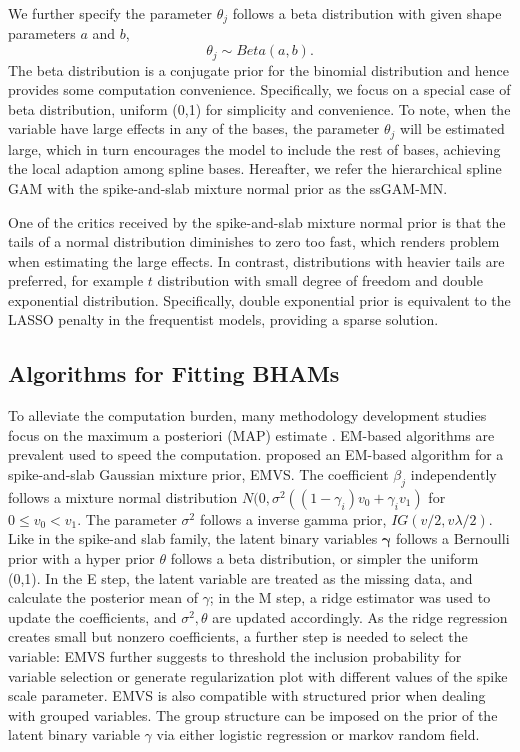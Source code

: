 \documentclass[AMA,STIX1COL,]{WileyNJD-v2}
\begin{document}
We further specify the parameter \(\theta_j\) follows a beta
distribution with given shape parameters \(a\) and \(b\), \[
\theta_j \sim Beta(a, b).
\] The beta distribution is a conjugate prior for the binomial
distribution and hence provides some computation convenience.
Specifically, we focus on a special case of beta distribution, uniform
(0,1) for simplicity and convenience. To note, when the variable have
large effects in any of the bases, the parameter \(\theta_j\) will be
estimated large, which in turn encourages the model to include the rest
of bases, achieving the local adaption among spline bases. Hereafter, we
refer the hierarchical spline GAM with the spike-and-slab mixture normal
prior as the ssGAM-MN.

One of the critics received by the spike-and-slab mixture normal prior
is that the tails of a normal distribution diminishes to zero too fast,
which renders problem when estimating the large effects. In contrast,
distributions with heavier tails are preferred, for example \(t\)
distribution with small degree of freedom and double exponential
distribution. Specifically, double exponential prior is equivalent to
the LASSO penalty in the frequentist models, providing a sparse
solution.

\hypertarget{algorithms-for-fitting-bhams}{%
\subsection{Algorithms for Fitting
BHAMs}\label{algorithms-for-fitting-bhams}}

To alleviate the computation burden, many methodology development
studies focus on the maximum a posteriori (MAP) estimate
\citep{Tipping2004}. EM-based algorithms are prevalent used to speed the
computation. \citet{Rockova2014a} proposed an EM-based algorithm for a
spike-and-slab Gaussian mixture prior, EMVS. The coefficient \(\beta_j\)
independently follows a mixture normal distribution
\(N(0, \sigma^2((1-\gamma_i)v_0 + \gamma_i v_1)\) for
\(0 \leq v_0 < v_1\). The parameter \(\sigma^2\) follows a inverse gamma
prior, \(IG(v/2, v\lambda /2)\). Like in the spike-and slab family, the
latent binary variables \(\boldsymbol{\gamma}\) follows a Bernoulli
prior with a hyper prior \(\theta\) follows a beta distribution, or
simpler the uniform (0,1). In the E step, the latent variable are
treated as the missing data, and calculate the posterior mean of
\(\gamma\); in the M step, a ridge estimator was used to update the
coefficients, and \(\sigma^2, \theta\) are updated accordingly. As the
ridge regression creates small but nonzero coefficients, a further step
is needed to select the variable: EMVS further suggests to threshold the
inclusion probability for variable selection or generate regularization
plot with different values of the spike scale parameter. EMVS is also
compatible with structured prior when dealing with grouped variables.
The group structure can be imposed on the prior of the latent binary
variable \(\gamma\) via either logistic regression or markov random
field.
\end{document}
